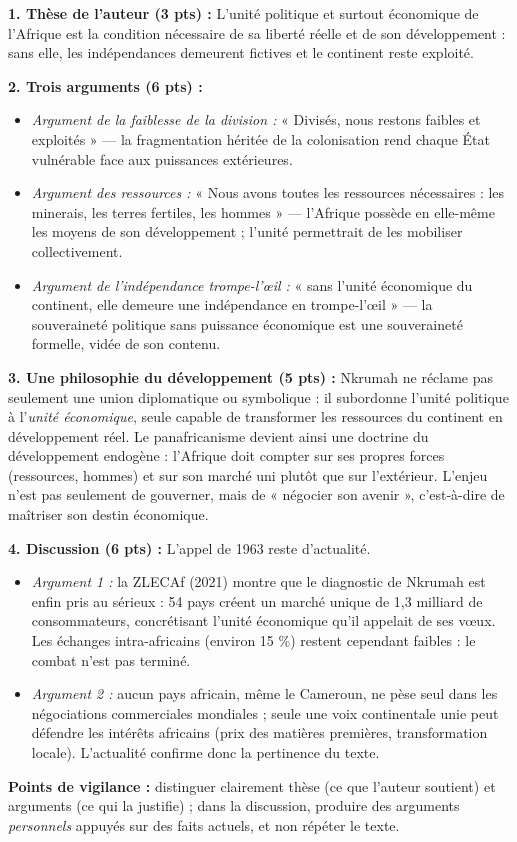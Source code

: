 \documentclass[11pt]{article}
\begin{document}
\begin{corrige}
\textbf{1. Thèse de l'auteur (3 pts) :} L'unité politique et surtout économique de l'Afrique est la condition nécessaire de sa liberté réelle et de son développement : sans elle, les indépendances demeurent fictives et le continent reste exploité.

\textbf{2. Trois arguments (6 pts) :}
\begin{itemize}
\item \emph{Argument de la faiblesse de la division :} « Divisés, nous restons faibles et exploités » — la fragmentation héritée de la colonisation rend chaque État vulnérable face aux puissances extérieures.
\item \emph{Argument des ressources :} « Nous avons toutes les ressources nécessaires : les minerais, les terres fertiles, les hommes » — l'Afrique possède en elle-même les moyens de son développement ; l'unité permettrait de les mobiliser collectivement.
\item \emph{Argument de l'indépendance trompe-l'œil :} « sans l'unité économique du continent, elle demeure une indépendance en trompe-l'œil » — la souveraineté politique sans puissance économique est une souveraineté formelle, vidée de son contenu.
\end{itemize}

\textbf{3. Une philosophie du développement (5 pts) :} Nkrumah ne réclame pas seulement une union diplomatique ou symbolique : il subordonne l'unité politique à l'\emph{unité économique}, seule capable de transformer les ressources du continent en développement réel. Le panafricanisme devient ainsi une doctrine du développement endogène : l'Afrique doit compter sur ses propres forces (ressources, hommes) et sur son marché uni plutôt que sur l'extérieur. L'enjeu n'est pas seulement de gouverner, mais de « négocier son avenir », c'est-à-dire de maîtriser son destin économique.

\textbf{4. Discussion (6 pts) :} L'appel de 1963 reste d'actualité.
\begin{itemize}
\item \emph{Argument 1 :} la ZLECAf (2021) montre que le diagnostic de Nkrumah est enfin pris au sérieux : 54 pays créent un marché unique de 1,3 milliard de consommateurs, concrétisant l'unité économique qu'il appelait de ses vœux. Les échanges intra-africains (environ 15 \%) restent cependant faibles : le combat n'est pas terminé.
\item \emph{Argument 2 :} aucun pays africain, même le Cameroun, ne pèse seul dans les négociations commerciales mondiales ; seule une voix continentale unie peut défendre les intérêts africains (prix des matières premières, transformation locale). L'actualité confirme donc la pertinence du texte.
\end{itemize}

\textbf{Points de vigilance :} distinguer clairement thèse (ce que l'auteur soutient) et arguments (ce qui la justifie) ; dans la discussion, produire des arguments \emph{personnels} appuyés sur des faits actuels, et non répéter le texte.
\end{corrige}
\end{document}
